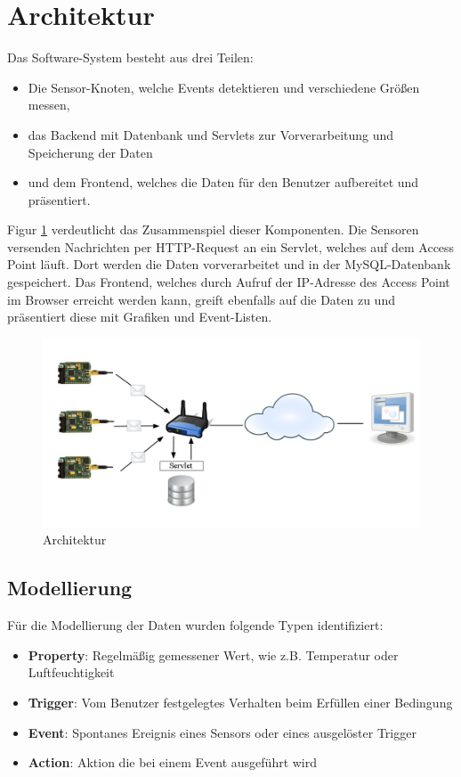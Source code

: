 \documentclass[12pt,a4paper,twoside]{article}
\newcommand{\labelSec}[1]{\label{sec:#1}}
\begin{document}
\section{Architektur}\labelSec{abschnitt}
Das Software-System besteht aus drei Teilen: 
\begin{itemize}
\item Die Sensor-Knoten, welche Events detektieren und verschiedene Größen messen,
\item das Backend mit Datenbank und Servlets zur Vorverarbeitung und Speicherung der Daten
\item und dem Frontend, welches die Daten für den Benutzer aufbereitet und präsentiert.
\end{itemize}
Figur \ref{architecture} verdeutlicht das Zusammenspiel dieser Komponenten. Die Sensoren versenden Nachrichten per HTTP-Request an ein Servlet, welches auf dem Access Point läuft. Dort werden die Daten vorverarbeitet und in der MySQL-Datenbank gespeichert. Das Frontend, welches durch Aufruf der IP-Adresse des Access Point im Browser erreicht werden kann, greift ebenfalls auf die Daten zu und präsentiert diese mit Grafiken und Event-Listen. 

\begin{figure}[htbp]
   \centering
   \includegraphics[width=12cm]{fig/Architektur.png}
   \caption{Architektur}
   \label{architecture}
\end{figure}

\subsection*{Modellierung}
Für die Modellierung der Daten wurden folgende Typen identifiziert: 
\begin{itemize}
\item 
\textbf{Property}: Regelmäßig gemessener Wert, wie z.B. Temperatur oder Luftfeuchtigkeit
\item 
\textbf{Trigger}: Vom Benutzer festgelegtes Verhalten beim
Erfüllen einer Bedingung
\item 
\textbf{Event}: Spontanes Ereignis eines Sensors oder eines ausgelöster Trigger
\item 
\textbf{Action}: Aktion die bei einem Event ausgeführt wird
\end{itemize}
\end{document}
